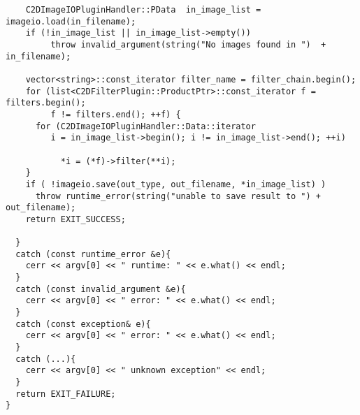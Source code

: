 \documentclass[english, 10pt, a4paper,headsepline,openany]{scrbook}
\begin{document}
\begin{lstlisting}
    C2DImageIOPluginHandler::PData  in_image_list = imageio.load(in_filename);  
    if (!in_image_list || in_image_list->empty())
         throw invalid_argument(string("No images found in ")  + in_filename);

    vector<string>::const_iterator filter_name = filter_chain.begin();
    for (list<C2DFilterPlugin::ProductPtr>::const_iterator f = filters.begin(); 
         f != filters.end(); ++f) {
      for (C2DImageIOPluginHandler::Data::iterator   
         i = in_image_list->begin(); i != in_image_list->end(); ++i)
    
           *i = (*f)->filter(**i);
    }
    if ( !imageio.save(out_type, out_filename, *in_image_list) )
      throw runtime_error(string("unable to save result to ") + out_filename);
    return EXIT_SUCCESS; 

  } 
  catch (const runtime_error &e){
    cerr << argv[0] << " runtime: " << e.what() << endl;
  }
  catch (const invalid_argument &e){
    cerr << argv[0] << " error: " << e.what() << endl;
  }
  catch (const exception& e){
    cerr << argv[0] << " error: " << e.what() << endl;
  }
  catch (...){
    cerr << argv[0] << " unknown exception" << endl;
  }
  return EXIT_FAILURE;
}  
\end{lstlisting}  
\end{document}
